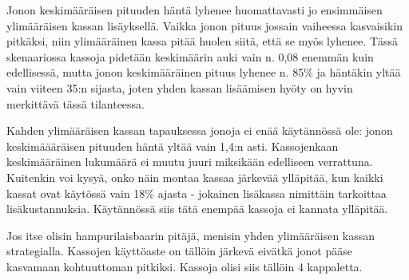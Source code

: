 \documentclass{article}     %
\begin{document}
Jonon keskimääräisen pituuden häntä lyhenee huomattavasti jo ensimmäisen ylimääräisen kassan lisäyksellä. Vaikka jonon pituus jossain vaiheessa kasvaisikin pitkäksi, niin ylimääräinen kassa pitää huolen siitä, että se myös lyhenee. Tässä skenaariossa kassoja pidetään keskimäärin auki vain n. 0,08 enemmän kuin edellisessä, mutta jonon keskimääräinen pituus lyhenee n. 85\% ja häntäkin yltää vain viiteen 35:n sijasta, joten yhden kassan lisäämisen hyöty on hyvin merkittävä tässä tilanteessa.

Kahden ylimääräisen kassan tapauksessa jonoja ei enää käytännössä ole: jonon keskimäääräisen pituuden häntä yltää vain 1,4:n asti. Kassojenkaan keskimääräinen lukumäärä ei muutu juuri miksikään edelliseen verrattuna. Kuitenkin voi kysyä, onko näin montaa kassaa järkevää ylläpitää, kun kaikki kassat ovat käytössä vain 18\% ajasta - jokainen lisäkassa nimittäin tarkoittaa lisäkustannuksia. Käytännössä siis tätä enempää kassoja ei kannata ylläpitää.

Jos itse olisin hampurilaisbaarin pitäjä, menisin yhden ylimääräisen kassan strategialla. Kassojen käyttöaste on tällöin järkevä eivätkä jonot pääse kasvamaan kohtuuttoman pitkiksi. Kassoja olisi siis tällöin 4 kappaletta.
\end{document}
